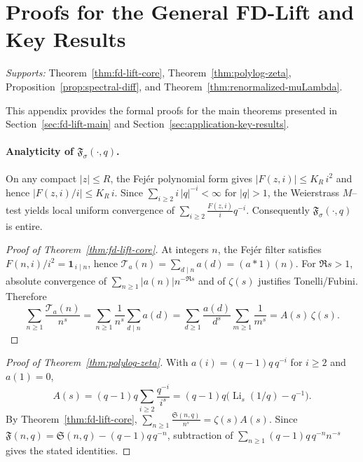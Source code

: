 \section{Proofs for the General FD-Lift and Key Results}\label{app:fdlift-proofs}
\noindent\textit{Supports:} Theorem~\ref{thm:fd-lift-core}, Theorem~\ref{thm:polylog-zeta}, Proposition~\ref{prop:spectral-diff}, and Theorem~\ref{thm:renormalized-muLambda}.

This appendix provides the formal proofs for the main theorems presented in Section~\ref{sec:fd-lift-main} and Section~\ref{sec:application-key-results}.

\paragraph{Analyticity of $\mathfrak{F}_\sigma(\cdot,q)$.}
On any compact $|z|\le R$, the Fejér polynomial form gives $|F(z,i)|\le K_R\,i^2$ and hence $|F(z,i)/i|\le K_R\,i$. Since $\sum_{i\ge2} i\,|q|^{-i}<\infty$ for $|q|>1$, the Weierstrass $M$–test yields local uniform convergence of $\sum_{i\ge2} \frac{F(z,i)}{i}q^{-i}$. Consequently $\mathfrak{F}_\sigma(\cdot,q)$ is entire.

\begin{proof}[Proof of Theorem~\ref{thm:fd-lift-core}]
At integers $n$, the Fej\'er filter satisfies $F(n,i)/i^2=\mathbf 1_{\,i\mid n}$, hence $\mathcal T_a(n)=\sum_{d\mid n}a(d)=(a*1)(n)$. For $\Re s>1$, absolute convergence of $\sum_{n\ge1} |a(n)|n^{-\Re s}$ and of $\zeta(s)$ justifies Tonelli/Fubini. Therefore
\[
\sum_{n\ge1}\frac{\mathcal T_a(n)}{n^s}
=\sum_{n\ge1}\frac{1}{n^s}\sum_{d\mid n}a(d)
=\sum_{d\ge1}\frac{a(d)}{d^s}\sum_{m\ge1}\frac{1}{m^s}
=A(s)\,\zeta(s).
\]
\end{proof}

\begin{proof}[Proof of Theorem~\ref{thm:polylog-zeta}]
With $a(i)=(q-1)q\,q^{-i}$ for $i\ge2$ and $a(1)=0$,
\[
A(s)=(q-1)q\sum_{i\ge2}\frac{q^{-i}}{i^s}=(q-1)q\bigl(\operatorname{Li}_s(1/q)-q^{-1}\bigr).
\]
By Theorem~\ref{thm:fd-lift-core},
\(
\sum_{n\ge1}\frac{\mathfrak S(n,q)}{n^s}=\zeta(s)A(s).
\)
Since $\mathfrak F(n,q)=\mathfrak S(n,q)-(q-1)q\,q^{-n}$, subtraction of $\sum_{n\ge1}(q-1)q\,q^{-n}n^{-s}$ gives the stated identities.
\end{proof}

